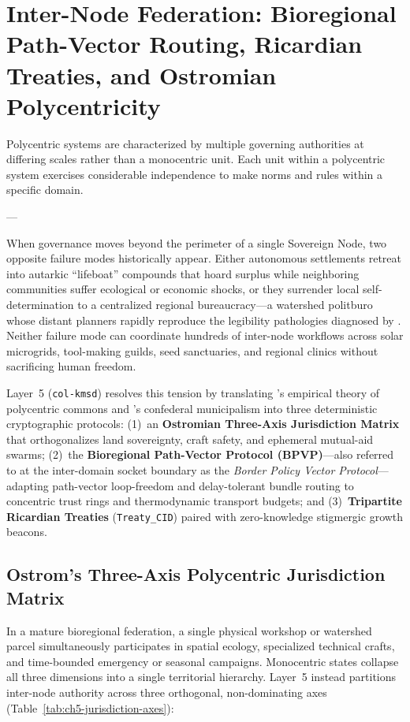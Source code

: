 \chapter{Inter-Node Federation: Bioregional Path-Vector Routing, Ricardian Treaties, and Ostromian Polycentricity}
\label{ch:l5-bpvp-federation}

\epigraph{Polycentric systems are characterized by multiple governing authorities at differing scales rather than a monocentric unit. Each unit within a polycentric system exercises considerable independence to make norms and rules within a specific domain.}{---\textcite{ostrom2010}}

When governance moves beyond the perimeter of a single Sovereign Node, two opposite failure modes
historically appear. Either autonomous settlements retreat into autarkic ``lifeboat'' compounds
that hoard surplus while neighboring communities suffer ecological or economic shocks, or they
surrender local self-determination to a centralized regional bureaucracy---a watershed politburo
whose distant planners rapidly reproduce the legibility pathologies diagnosed by
\textcite{scott1998}. Neither failure mode can coordinate hundreds of inter-node workflows across
solar microgrids, tool-making guilds, seed sanctuaries, and regional clinics without sacrificing
human freedom.

Layer~5 (\texttt{col-kmsd}) resolves this tension by translating \textcite{ostrom1990,ostrom2010}'s
empirical theory of polycentric commons and \textcite{bookchin1982}'s confederal municipalism into
three deterministic cryptographic protocols: (1)~an \textbf{Ostromian Three-Axis Jurisdiction
Matrix} that orthogonalizes land sovereignty, craft safety, and ephemeral mutual-aid swarms;
(2)~the \textbf{Bioregional Path-Vector Protocol (BPVP)}---also referred to at the inter-domain
socket boundary as the \textit{Border Policy Vector Protocol}---adapting path-vector loop-freedom
\parencite{rekhter2006} and delay-tolerant bundle routing \parencite{fall2003} to concentric trust
rings and thermodynamic transport budgets; and (3)~\textbf{Tripartite Ricardian Treaties}
(\texttt{Treaty\_CID}) \parencite{grigg2004} paired with zero-knowledge stigmergic growth beacons.

\section{Ostrom's Three-Axis Polycentric Jurisdiction Matrix}
\label{sec:ch5-three-axis}

In a mature bioregional federation, a single physical workshop or watershed parcel simultaneously
participates in spatial ecology, specialized technical crafts, and time-bounded emergency or
seasonal campaigns. Monocentric states collapse all three dimensions into a single territorial
hierarchy. Layer~5 instead partitions inter-node authority across three orthogonal, non-dominating
axes (Table~\ref{tab:ch5-jurisdiction-axes}):

